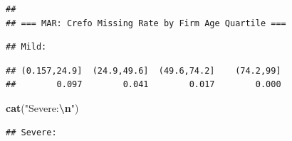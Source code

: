 \documentclass[
]{article}
\newenvironment{Shaded}{\begin{snugshade}}{\end{snugshade}}
\newcommand{\AttributeTok}[1]{\textcolor[rgb]{0.13,0.29,0.53}{#1}}
\newcommand{\DecValTok}[1]{\textcolor[rgb]{0.00,0.00,0.81}{#1}}
\newcommand{\FunctionTok}[1]{\textcolor[rgb]{0.13,0.29,0.53}{\textbf{#1}}}
\newcommand{\NormalTok}[1]{#1}
\newcommand{\OtherTok}[1]{\textcolor[rgb]{0.56,0.35,0.01}{#1}}
\newcommand{\SpecialCharTok}[1]{\textcolor[rgb]{0.81,0.36,0.00}{\textbf{#1}}}
\newcommand{\StringTok}[1]{\textcolor[rgb]{0.31,0.60,0.02}{#1}}
\begin{document}
\begin{verbatim}
## 
## === MAR: Crefo Missing Rate by Firm Age Quartile ===
\end{verbatim}

\begin{Shaded}
\end{Shaded}

\begin{verbatim}
## Mild:
\end{verbatim}

\begin{Shaded}
\end{Shaded}

\begin{verbatim}
## (0.157,24.9]  (24.9,49.6]  (49.6,74.2]    (74.2,99] 
##        0.097        0.041        0.017        0.000
\end{verbatim}

\begin{Shaded}
\begin{Highlighting}[]
\FunctionTok{cat}\NormalTok{(}\StringTok{"Severe:}\SpecialCharTok{\textbackslash{}n}\StringTok{"}\NormalTok{)}
\end{Highlighting}
\end{Shaded}

\begin{verbatim}
## Severe:
\end{verbatim}

\begin{Shaded}
\end{Shaded}
\end{document}
